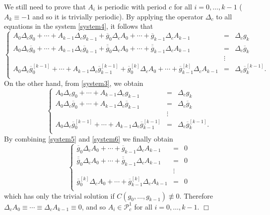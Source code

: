 \documentclass{amsart}
\theoremstyle{definition}
\numberwithin{equation}{section}
\numberwithin{theorem}{section}
\begin{document}
We still need to prove that $A_i$ is periodic with period $c$ for all $i=0,\ldots,k-1$ ($A_k\equiv -1$ and so it is trivially periodic). By applying the operator $\Delta_c$ to all equations in the system \eqref{system4}, it follows that
	\begin{equation}\label{system5}
	\left\{\begin{array}{lcl}
	A_0\Delta_c g_0+\cdots+A_{k-1} \Delta_c g_{k-1} + \overline{g}_0 \Delta_c A_0 + \cdots + \overline{g}_{k-1} \Delta_c A_{k-1}  &=& \Delta_c g_k\\
	A_0\Delta_c \overline{g}_0+\cdots+A_{k-1} \Delta_c \overline{g}_{k-1} + \overline{\overline{g}}_0 \Delta_c A_0 + \cdots + \overline{\overline{g}}_{k-1} \Delta_c A_{k-1}  &=& \Delta_c \overline{g}_k\\
	&\vdots&\\
	A_0\Delta_c \overline{g}^{[k-1]}_0+\cdots+A_{k-1} \Delta_c \overline{g}^{[k-1]}_{k-1} + \overline{g}^{[k]}_0 \Delta_c A_0 + \cdots + \overline{g}^{[k]}_{k-1} \Delta_c A_{k-1}  &=& \Delta_c \overline{g}^{[k-1]}_k.\\
	\end{array}\right.
	\end{equation}
On the other hand, from \eqref{system3}, we obtain
	\begin{equation}\label{system6}
	\left\{\begin{array}{lcl}
	A_0\Delta_c g_0+\cdots+A_{k-1} \Delta_c g_{k-1}   &=& \Delta_c g_k\\
	A_0\Delta_c \overline{g}_0+\cdots+A_{k-1} \Delta_c \overline{g}_{k-1}   &=& \Delta_c \overline{g}_k\\
	&\vdots&\\
	A_0\Delta_c \overline{g}^{[k-1]}_0+\cdots+A_{k-1} \Delta_c \overline{g}^{[k-1]}_{k-1}   &=& \Delta_c \overline{g}^{[k-1]}_k.\\
	\end{array}\right.
	\end{equation}
By combining \eqref{system5} and \eqref{system6} we finally obtain
	\begin{equation}\label{system7}
	\left\{\begin{array}{lcl}
	 \overline{g}_0 \Delta_c A_0 + \cdots + \overline{g}_{k-1} \Delta_c A_{k-1}  &=& 0\\
	 \overline{\overline{g}}_0 \Delta_c A_0 + \cdots + \overline{\overline{g}}_{k-1} \Delta_c A_{k-1}  &=& 0\\
	&\vdots&\\
	 \overline{g}^{[k]}_0 \Delta_c A_0 + \cdots + \overline{g}^{[k]}_{k-1} \Delta_c A_{k-1}  &=& 0\\
	\end{array}\right.
	\end{equation}
which has only the trivial solution if $C(g_0,\ldots,g_{k-1})\not\equiv0$. Therefore $\Delta_c A_0\equiv \cdots\equiv \Delta_c A_{k-1}\equiv 0$, and so $A_i\in\mathcal{P}^1_c$ for all $i=0,\ldots,k-1$. \hfill$\Box$
\end{document}
